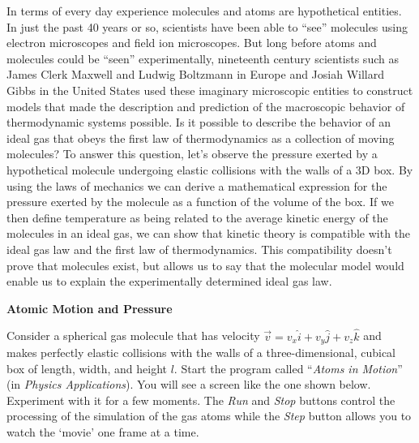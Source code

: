 In terms of every day experience molecules and atoms are hypothetical
entities. In just the past 40 years or so, scientists have been able
to ``see'' molecules using electron microscopes and
field ion microscopes. But long before atoms and molecules could be
``seen'' experimentally, nineteenth century scientists
such as James Clerk Maxwell and Ludwig Boltzmann in Europe and Josiah
Willard Gibbs in the United States used these imaginary microscopic
entities to construct models that made the description and prediction
of the macroscopic behavior of thermodynamic systems possible. Is
it possible to describe the behavior of an ideal gas that obeys the
first law of thermodynamics as a collection of moving molecules? To
answer this question, let's observe the pressure exerted by a hypothetical
molecule undergoing elastic collisions with the walls of a 3D box.
By using the laws of mechanics we can derive a mathematical expression
for the pressure exerted by the molecule as a function of the volume
of the box. If we then define temperature as being related to the
average kinetic energy of the molecules in an ideal gas, we can show
that kinetic theory is compatible with the ideal gas law and the first
law of thermodynamics. This compatibility doesn't prove that molecules
exist, but allows us to say that the molecular model would enable
us to explain the experimentally determined ideal gas law.

\textbf{Atomic Motion and Pressure}

Consider a spherical gas molecule that has velocity 
$\overrightarrow{v}=v_{x} \hat{i}+v_{y}  \hat{j} + v_z\hat k$ and
makes perfectly elastic collisions with the walls of a three-dimensional, cubical
box of length, width, and height $l$. Start the program called ``\textit{Atoms
in Motion}'' (in \textit{Physics Applications}). You will see a screen
like the one shown below. Experiment with it for a few moments. 
The \textit{Run} and \textit{Stop} buttons control the processing of the 
simulation of the gas atoms while the \textit{Step} button allows you to watch the
`movie' one frame at a time.

